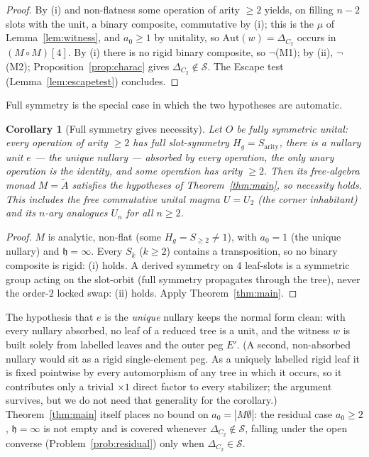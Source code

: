 \documentclass[11pt]{amsart}
\theoremstyle{plain}
\newtheorem{corollary}[theorem]{Corollary}
\theoremstyle{definition}
\begin{document}
\begin{proof}
By (i) and non-flatness some operation of arity $\ge2$ yields, on filling $n-2$ slots with the unit, a
binary composite, commutative by (i); this is the $\mu$ of Lemma~\ref{lem:witness}, and $a_0\ge1$ by
unitality, so $\mathrm{Aut}(w)=\Delta_{C_2}$ occurs in $(M\circ M)[4]$. By (i) there is no rigid binary
composite, so $\neg$(M1); by (ii), $\neg$(M2); Proposition~\ref{prop:charac} gives
$\Delta_{C_2}\notin\mathcal S$. The Escape test (Lemma~\ref{lem:escapetest}) concludes.
\end{proof}

Full symmetry is the special case in which the two hypotheses are automatic.

\begin{corollary}[Full symmetry gives necessity]\label{thm:family}
Let $O$ be \emph{fully symmetric unital}: every operation of arity $\ge2$ has full slot-symmetry
$H_g=S_{\mathrm{arity}}$, there is a nullary unit $e$ --- the \emph{unique} nullary --- absorbed by every
operation, the only unary operation is the identity, and some operation has arity $\ge2$. Then its
free-algebra monad $M=\tilde A$ satisfies the hypotheses of Theorem~\ref{thm:main}, so necessity holds.
This includes the free commutative unital magma $U=U_2$ \textup{(}the corner inhabitant\textup{)} and its
$n$-ary analogues $U_n$ for all $n\ge2$.
\end{corollary}

\begin{proof}
$M$ is analytic, non-flat (some $H_g=S_{\ge2}\ne1$), with $a_0=1$ (the unique nullary) and
$\mathfrak h=\infty$. Every $S_k$ ($k\ge2$) contains a transposition, so no binary composite is rigid:
(i) holds. A derived symmetry on $4$ leaf-slots is a symmetric group acting on the slot-orbit (full
symmetry propagates through the tree), never the order-$2$ locked swap: (ii) holds. Apply
Theorem~\ref{thm:main}.
\end{proof}

The hypothesis that $e$ is the \emph{unique} nullary keeps the normal form clean: with every nullary
absorbed, no leaf of a reduced tree is a unit, and the witness $w$ is built solely from labelled leaves
and the outer peg $E'$. (A second, non-absorbed nullary would sit as a rigid single-element peg. As a uniquely
labelled rigid leaf it is fixed pointwise by every automorphism of any tree in which it occurs, so it
contributes only a trivial $\times1$ direct factor to every stabilizer; the argument survives, but we do
not need that generality for the corollary.) Theorem~\ref{thm:main} itself places no bound on $a_0=|M\emptyset|$:
the residual case $a_0\ge2$, $\mathfrak h=\infty$ is not empty and is covered whenever
$\Delta_{C_2}\notin\mathcal S$, falling under the open converse (Problem~\ref{prob:residual}) only when
$\Delta_{C_2}\in\mathcal S$.
\end{document}
